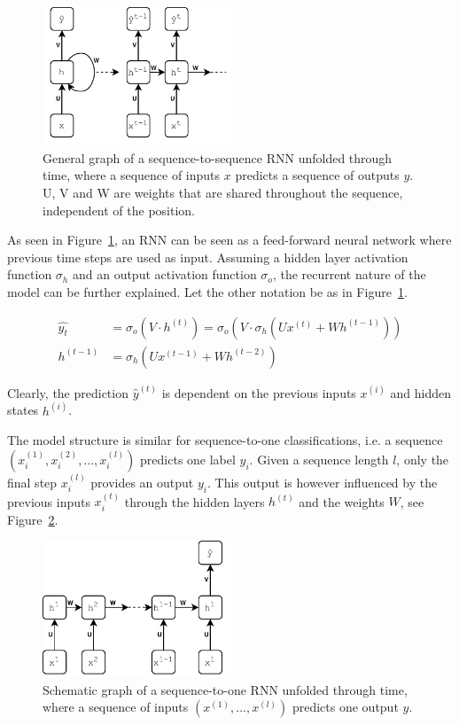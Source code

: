 \begin{figure}[H]
    \centering
    \includegraphics[width=0.5\textwidth]{Figures/figs-simplernn.pdf}
    \caption{General graph of a sequence-to-sequence RNN unfolded through time, where a sequence of inputs $x$ predicts a sequence of outputs $y$. U, V and W are weights that are shared throughout the sequence, independent of the position.}
    \label{fig:rnn}
\end{figure}

As seen in Figure~\ref{fig:rnn}, an RNN can be seen as a feed-forward neural network where previous time steps are used as input. Assuming a hidden layer activation function $\sigma_h$ and an output activation function $\sigma_o$, the recurrent nature of the model can be further explained. Let the other notation be as in Figure~\ref{fig:rnn}. 

\begin{align}
    \hat{y_t} &= \sigma_o(V \cdot h^{(t)}) = \sigma_o(V \cdot  \sigma_h(U x^{(t)} + W h^{(t-1)})) \\
    h^{(t-1)} &= \sigma_h(Ux^{(t-1)} + W h^{(t-2)})
\end{align}

Clearly, the prediction $\hat{y}^{(t)}$ is dependent on the previous inputs $x^{(i)}$ and hidden states $h^{(i)}$. 

The model structure is similar for sequence-to-one classifications, i.e. a sequence $(x_i^{(1)}, x_i^{(2)}, ..., x_i^{(l)})$ predicts one label $\hat{y}_i$. Given a sequence length $l$, only the final step $x_i^{(l)}$ provides an output $y_i$. This output is however influenced by the previous inputs $x_i^{(t)}$ through the hidden layers $h^{(t)}$ and the weights $W$, see Figure~\ref{fig:rnns2o}. 


\begin{figure}[H]
    \centering
    \includegraphics[width=0.5\textwidth]{Figures/figs-rnn-s2o.pdf}
    \caption{Schematic graph of a sequence-to-one RNN unfolded through time, where a sequence of inputs $(x^{(1)}, ..., x^{(l)})$ predicts one output $y$.}
    \label{fig:rnns2o}
\end{figure}

